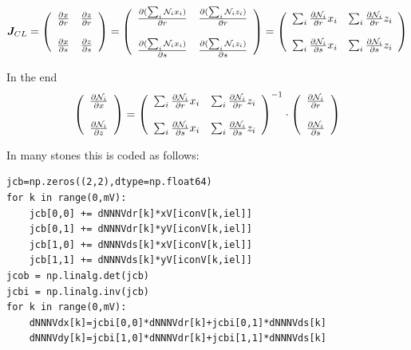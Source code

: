 \[
{\bm J}_{CL}
=
\left(
\begin{array}{cc}
\frac{\partial x}{\partial r}  & 
\frac{\partial z}{\partial r}   \\ \\
\frac{\partial x}{\partial s}  & 
\frac{\partial z}{\partial s}  
\end{array}
\right)
=
\left(
\begin{array}{cc}
\frac{\partial (\sum_i {\mathcal{N}}_i x_i)}{\partial r}  & 
\frac{\partial (\sum_i {\mathcal{N}}_i z_i)}{\partial r}   \\ \\
\frac{\partial (\sum_i {\mathcal{N}}_i x_i)}{\partial s}  & 
\frac{\partial (\sum_i {\mathcal{N}}_i z_i)}{\partial s}  
\end{array}
\right)
=
\left(
\begin{array}{cc}
\sum_i\frac{\partial {\mathcal{N}}_i}{\partial r}x_i  & 
\sum_i\frac{\partial {\mathcal{N}}_i}{\partial r}z_i   \\ \\
\sum_i\frac{\partial {\mathcal{N}}_i}{\partial s}x_i  & 
\sum_i\frac{\partial {\mathcal{N}}_i}{\partial s}z_i  
\end{array}
\right)
\]

In the end
\begin{equation}
\left(
\begin{array}{c}
\frac{\partial {\mathcal{N}}_i}{\partial x} \\ \\
\frac{\partial {\mathcal{N}}_i}{\partial z} 
\end{array}
\right)
=
\left(
\begin{array}{cc}
\sum_i\frac{\partial {\mathcal{N}}_i}{\partial r}x_i  & 
\sum_i\frac{\partial {\mathcal{N}}_i}{\partial r}z_i   \\ \\
\sum_i\frac{\partial {\mathcal{N}}_i}{\partial s}x_i  & 
\sum_i\frac{\partial {\mathcal{N}}_i}{\partial s}z_i  
\end{array}
\right)^{-1}
\cdot
\left(
\begin{array}{c}
\frac{\partial {\mathcal{N}}_i}{\partial r} \\ \\
\frac{\partial {\mathcal{N}}_i}{\partial s} 
\end{array}
\right)
\label{eq:mappDJ1}
\end{equation}

\vspace{.5cm}

In many stones this is coded as follows:
\begin{lstlisting}
jcb=np.zeros((2,2),dtype=np.float64)
for k in range(0,mV):
    jcb[0,0] += dNNNVdr[k]*xV[iconV[k,iel]]
    jcb[0,1] += dNNNVdr[k]*yV[iconV[k,iel]]
    jcb[1,0] += dNNNVds[k]*xV[iconV[k,iel]]
    jcb[1,1] += dNNNVds[k]*yV[iconV[k,iel]]
jcob = np.linalg.det(jcb)
jcbi = np.linalg.inv(jcb)
for k in range(0,mV):
    dNNNVdx[k]=jcbi[0,0]*dNNNVdr[k]+jcbi[0,1]*dNNNVds[k]
    dNNNVdy[k]=jcbi[1,0]*dNNNVdr[k]+jcbi[1,1]*dNNNVds[k]
\end{lstlisting}



